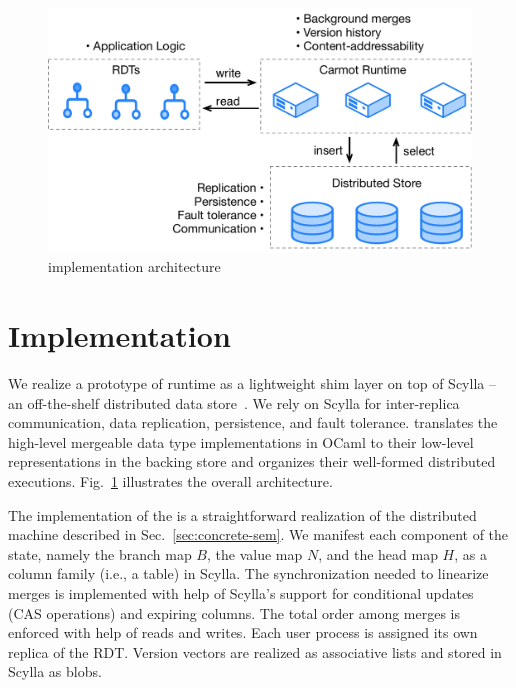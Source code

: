 \begin{figure}[ht]
  \centering
    \includegraphics[scale=0.35]{Figures/implementation2}
\caption{\quark implementation architecture}
\label{fig:implementation}
  \vspace*{-0.2in}
\end{figure}

\section{Implementation}
\label{sec:implementation}

We realize a prototype of \quark runtime as a lightweight shim layer
on top of Scylla -- an off-the-shelf distributed data
store~\cite{scylla}. We rely on Scylla for inter-replica
communication, data replication, persistence, and fault tolerance.
\quark translates the high-level mergeable data type implementations
in OCaml to their low-level representations in the backing store and
organizes their well-formed distributed executions.
Fig.~\ref{fig:implementation} illustrates the overall architecture.

The implementation of \quark the is a straightforward realization of
the \quark distributed machine described in Sec.~\ref{sec:concrete-sem}.
We manifest each component of the state, namely the branch map $B$,
the value map $N$, and the head map $H$, as a column family (i.e., a
table) in Scylla. The synchronization needed to linearize merges is
implemented with help of Scylla's support for conditional updates (CAS
operations) and expiring columns. The total order among merges is
enforced with help of  reads and writes. Each user process
is assigned its own replica of the RDT.  Version vectors are realized
as associative lists and stored in Scylla
as blobs.

